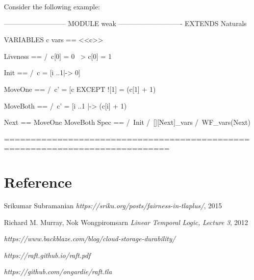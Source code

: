 \documentclass{report}
\begin{document}
Consider the following example:
\begin{tla}
--------------------------- MODULE weak ----------------------------
EXTENDS Naturals

VARIABLES c
vars == <<c>>

Liveness == 
    /\ c[0] = 0 ~> c[0] = 1

Init ==
    /\ c = [i ..1|-> 0] 

MoveOne == 
    /\ c' = [c EXCEPT ![1] = (c[1] + 1) %

MoveBoth ==
    /\ c' = [i ..1 |-> (c[i] + 1) %

Next == 
    \/ MoveOne
    \/ MoveBoth
Spec ==
  /\ Init
  /\ [][Next]_vars
  /\ WF_vars(Next)

=============================================================================
\end{tla}
\begin{tlatex}
\@x{}\moduleLeftDash{}\moduleRightDash\@xx{}%
%
\@pvspace{8.0pt}%
%
%
\@pvspace{8.0pt}%
%
%
\@pvspace{8.0pt}%
%
%
\@pvspace{8.0pt}%
%
\@pvspace{8.0pt}%
%
\@pvspace{8.0pt}%
%
%
%
%
%
%
%
\@pvspace{8.0pt}%
\@x{}\bottombar\@xx{}%
\end{tlatex}



\chapter{Reference}

\begin{thebibliography}{9}

\bibitem{}
Srikumar Subramanian
\textit{https://sriku.org/posts/fairness-in-tlaplus/}, 2015

\bibitem{}
Richard M. Murray, Nok Wongpiromsarn
\textit{Linear Temporal Logic, Lecture 3}, 2012

\textit{https://www.backblaze.com/blog/cloud-storage-durability/}

\textit{https://raft.github.io/raft.pdf}

\textit{https://github.com/ongardie/raft.tla}

\end{thebibliography}
\end{document}
